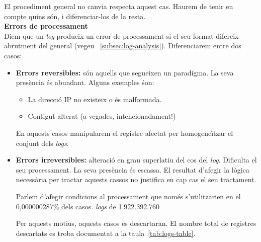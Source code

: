 \noindent
El procediment general no canvia respecta aquest cas.
Haurem de tenir en compte quins són, i diferenciar-los de la resta. \\

\noindent
\textbf{Errors de processament} \\

\noindent
Diem que un \textit{log} produeix un error de processament si el seu format difereix abrutment del general (vegeu ~\ref{subsec:log-analysis}).
Diferenciarem entre dos casos:

\begin{itemize}
    \item \textbf{Errors reversibles:} són aquells que segueixen un paradigma.
    La seva presència és abundant.
    Alguns exemples śon:
    \begin{itemize}
        \item La direcció \gls{IP} no existeix o és malformada.
        \item Contigut alterat (a vegades, intencionadament!)
    \end{itemize}
    En aquests casos manipularem el registre afectat per homogeneïtzar el conjunt dels \textit{logs}.
    \item \textbf{Errors irreversibles:} alteració en grau superlatiu del cos del \textit{log}.
    Dificulta el seu processament.
    La seva presència és escassa.
    El resultat d'afegir la lògica necessària per tractar aquests cassos no justifica en cap cas el seu tractament.

    \begin{tcolorbox}[colback=green!5!white, colframe=green!50!black, title=No val la pena]\label{tcbox:no-val-la-pena}
    Parlem d'afegir condicions al processament que només s'utilitzarien en el 0,000000287\% dels casos.
     \textit{logs} de 1.922.392.760
    \end{tcolorbox}

    Per aquests motius, aquests casos es descartaran.
    El nombre total de registres descartats es troba documentat a la taula~\ref{tab:logs-table}.
\end{itemize}


%

